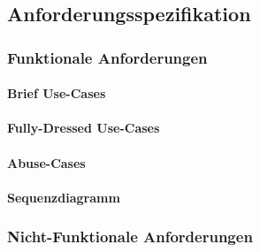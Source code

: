 \subsection{Anforderungsspezifikation}

\subsubsection{Funktionale Anforderungen}

\paragraph{Brief Use-Cases}


\paragraph{Fully-Dressed Use-Cases}


\paragraph{Abuse-Cases}
\paragraph{Sequenzdiagramm}

\subsubsection{Nicht-Funktionale Anforderungen}

